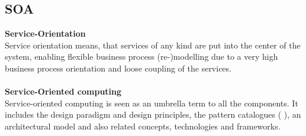 \documentclass[12pt]{article}
\begin{document}
\subsection{SOA}
\textbf{Service-Orientation}\\
Service orientation means, that services of any kind are put into the center of the system, enabling flexible business process (re-)modelling due to a very high business process orientation and loose coupling of the services.\\ \\
\textbf{Service-Oriented computing}\\
Service-oriented computing is seen as an umbrella term to all the components. It includes the design paradigm and design principles, the pattern catalogues ( \cite{patterns}), an architectural model and also related concepts, technologies and frameworks.\cite[page 22]{grau}\\ \\ 
\end{document}
